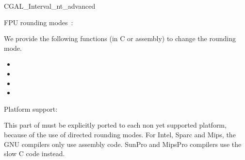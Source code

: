 \begin{ccAdvanced}
\begin{ccClass} {CGAL_Interval_nt_advanced}

FPU rounding modes~:

We provide the following functions (in C or assembly) to change the 
rounding mode.
\begin{itemize}
\item {}
\item {}
\item {}
\item {}
\end{itemize}

Platform support:

This part of {\cgal} must be explicitly ported to each non yet supported
platform, because of the use of directed rounding modes.  For Intel, Sparc and
Mips, the GNU compilers only use assembly code.  SunPro and MipsPro compilers
use the slow C code instead.

% 

\end{ccClass}

\end{ccAdvanced}

